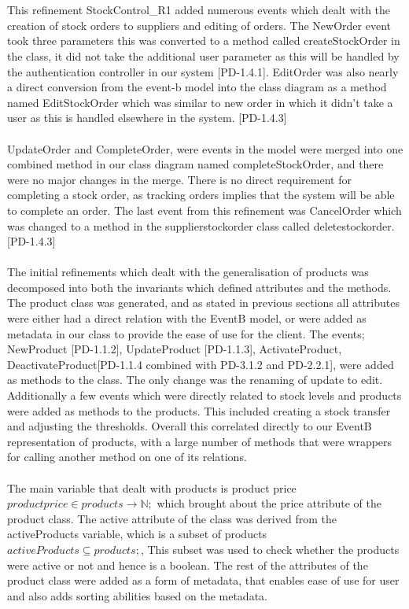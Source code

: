 \documentclass[a4paper]{article}
\begin{document}
\\\\
This refinement StockControl\_R1 added numerous events which dealt with the creation of stock orders to suppliers and editing of orders. The NewOrder event took three parameters this was converted to a method called createStockOrder in the class, it did not take the additional user parameter as this will be handled by the authentication controller in our system [PD-1.4.1]. EditOrder was also nearly a direct conversion from the event-b model into the class diagram as a method named EditStockOrder which was similar to new order in which it didn't take a user as this is handled elsewhere in the system. [PD-1.4.3]
\\\\
UpdateOrder and CompleteOrder, were events in the model were merged into one combined method in our class diagram named completeStockOrder, and there were no major changes in the merge. There is no direct requirement for completing a stock order, as tracking orders implies that the system will be able to complete an order. The last event from this refinement was CancelOrder which was changed to a method in the supplierstockorder class called deletestockorder. [PD-1.4.3]
\\\\
The initial refinements which dealt with the generalisation of products was decomposed into both the invariants which defined attributes and the methods. The product class was generated, and as stated in previous sections all attributes were either had a direct relation with the EventB model, or were added as metadata in our class to provide the ease of use for the client. The events; NewProduct [PD-1.1.2], UpdateProduct [PD-1.1.3], ActivateProduct, DeactivateProduct[PD-1.1.4 combined with PD-3.1.2 and PD-2.2.1], were added as methods to the class. The only change was the renaming of update to edit. Additionally a few events which were directly related to stock levels and products were added as methods to the products. This included creating a stock transfer and adjusting the thresholds. Overall this correlated directly to our EventB representation of products, with a large number of methods that were wrappers for calling another method on one of its relations.
\\\\
The main variable that dealt with products is product price \(productprice \in products \to \mathbb{N};\) which brought about the price attribute of the product class. The active attribute of the class was derived from the activeProducts variable, which is a subset of products \(activeProducts \subseteq products;\), This subset was used to check whether the products were active or not and hence is a boolean. The  rest of the attributes of the product class were added as a form of metadata, that enables ease of use for user and also adds sorting abilities based on the metadata.
\end{document}
